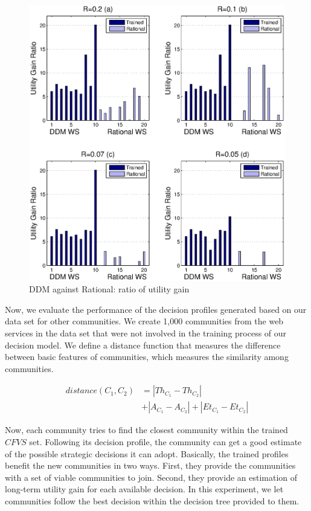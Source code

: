 {\begin{figure}%
\centering
\includegraphics[width=5in]{figures/utility_ratio.eps}
\caption{DDM against Rational: ratio of utility gain}
\label{utility_gain_mlisa_and_rational_ratio}
\end{figure}

Now, we evaluate the performance of the decision profiles generated based on our data set for other communities.%
We create 1,000 communities from the web services in the data set that were not involved in the training process of our decision model. We define a distance function that measures the difference between basic features of communities, which measures the similarity among communities.

\begin{equation}\label{distance_c}
\begin{split}
distance (C_1, C_2) & = |Th_{C_1} - Th_{C_2}| \\
                    & + |A_{C_1} - A_{C_2}| + |Et_{C_1} - Et_{C_2}|
\end{split}
\end{equation}

Now, each community tries to find the closest community within the trained $CFVS$ set. Following its decision profile, the community can get a good estimate of the possible strategic decisions it can adopt. Basically, the trained profiles benefit the new communities in two ways. First, they provide the communities with a set of viable communities to join. Second, they provide an estimation of long-term utility gain for each available decision. In this experiment, we let communities follow the best decision within the decision tree provided to them.


}
